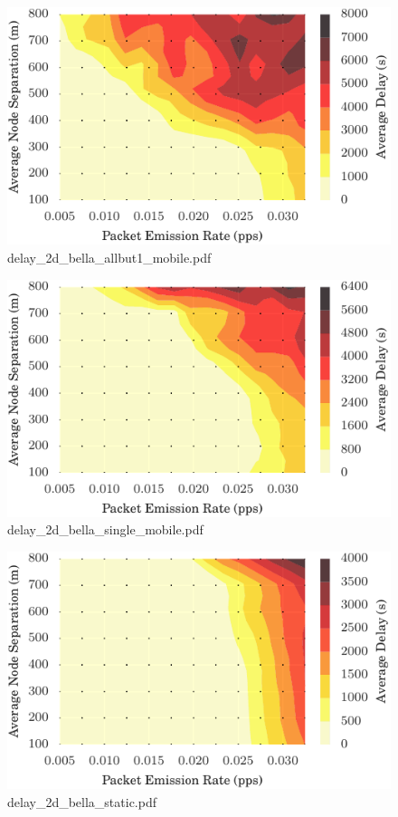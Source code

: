 \documentclass{article}
\begin{document}
\begin{figure}[h!]
\centering
\includegraphics[width=\linewidth]{delay_2d_bella_allbut1_mobile.pdf}
\caption{delay\_2d\_bella\_allbut1\_mobile.pdf}
\end{figure}




\begin{figure}[h!]
\centering
\includegraphics[width=\linewidth]{delay_2d_bella_single_mobile.pdf}
\caption{delay\_2d\_bella\_single\_mobile.pdf}
\end{figure}




\begin{figure}[h!]
\centering
\includegraphics[width=\linewidth]{delay_2d_bella_static.pdf}
\caption{delay\_2d\_bella\_static.pdf}
\end{figure}
\end{document}
